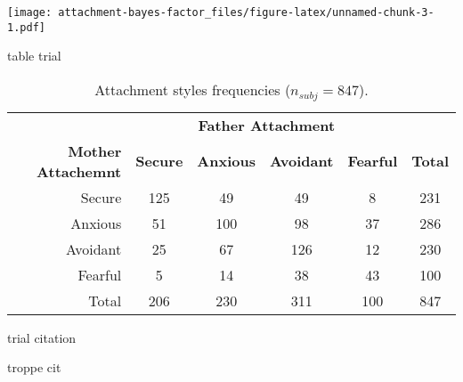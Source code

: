 \documentclass[
]{book}
\begin{document}
\texttt{[image: attachment-bayes-factor\_files/figure-latex/unnamed-chunk-3-1.pdf]}

table trial

\begin{table}[!h]

\caption{\label{tab:unnamed-chunk-4}Attachment styles frequencies ($n_{subj} = 847$).}
\centering
\begin{tabular}[t]{rccccc}
\toprule
\multicolumn{1}{c}{\textbf{ }} & \multicolumn{4}{c}{\textbf{Father Attachment}} & \multicolumn{1}{c}{\textbf{ }} \\
\cmidrule(l{3pt}r{3pt}){2-5}
\textbf{Mother Attachemnt} & \textbf{Secure} & \textbf{Anxious} & \textbf{Avoidant} & \textbf{Fearful} & \textbf{Total}\\
\midrule
Secure & 125 & 49 & 49 & 8 & 231\\
Anxious & 51 & 100 & 98 & 37 & 286\\
Avoidant & 25 & 67 & 126 & 12 & 230\\
Fearful & 5 & 14 & 38 & 43 & 100\\
Total & 206 & 230 & 311 & 100 & 847\\
\bottomrule
\end{tabular}
\end{table}

trial citation

\citep{guApproximatedAdjustedFractional2018}

troppe cit \citep{mcelreathStatisticalRethinkingBayesian2020}

  
\end{document}
